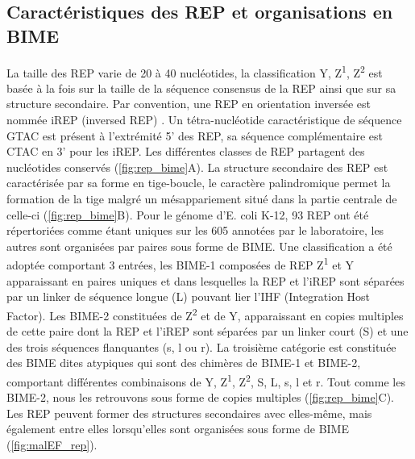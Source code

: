 \documentclass[12pt,a4paper]{report}
\begin{document}
\begin{onehalfspace}
\section*{Caractéristiques des REP et organisations en BIME}
La taille des REP varie de 20 à 40 nucléotides, la classification Y, Z\textsuperscript{1}, Z\textsuperscript{2} est basée à la fois sur la taille de la séquence consensus de la REP ainsi que sur sa structure secondaire. Par convention, une REP en orientation inversée est nommée iREP (inversed REP) \citep{Ton-Hoang2012}. Un tétra-nucléotide caractéristique de séquence GTAC est présent à l'extrémité 5' des REP, sa séquence complémentaire est CTAC en 3' pour les iREP. Les différentes classes de REP partagent des nucléotides conservés (\autoref{fig:rep_bime}A). La structure secondaire des REP est caractérisée par sa forme en tige-boucle, le caractère palindromique permet la formation de la tige malgré un mésappariement situé dans la partie centrale de celle-ci (\autoref{fig:rep_bime}B). Pour le génome d'E. coli K-12, 93 REP ont été répertoriées comme étant uniques sur les 605 annotées par le laboratoire, les autres sont organisées par paires sous forme de BIME. Une classification a été adoptée comportant 3 entrées, les BIME-1 composées de REP Z\textsuperscript{1} et Y apparaissant en paires uniques et dans lesquelles la REP et l'iREP sont séparées par un linker de séquence longue (L) pouvant lier l'IHF (Integration Host Factor). Les BIME-2 constituées de Z\textsuperscript{2} et de Y, apparaissant en copies multiples de cette paire dont la REP et l'iREP sont séparées par un linker court (S) et une des trois séquences flanquantes (s, l ou r). La troisième catégorie est constituée des BIME dites atypiques qui sont des chimères de BIME-1 et BIME-2, comportant différentes combinaisons de Y, Z\textsuperscript{1}, Z\textsuperscript{2}, S, L, s, l et r. Tout comme les BIME-2, nous les retrouvons sous forme de copies multiples (\autoref{fig:rep_bime}C). Les REP peuvent former des structures secondaires avec elles-même, mais également entre elles lorsqu'elles sont organisées sous forme de BIME (\autoref{fig:malEF_rep}).


\end{onehalfspace}
\end{document}
